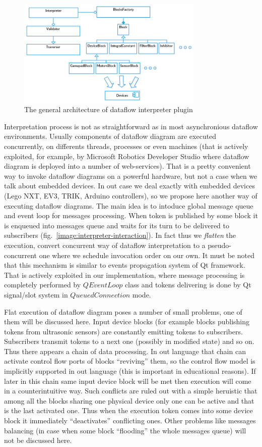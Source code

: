 \documentclass[conference,compsoc]{IEEEtran}
\begin{document}
\begin{figure}[ht]
	\centering
	\includegraphics[width=3.5in]{Interpreter.png}
	\caption{The general architecture of dataflow interpreter plugin}
	\label{image:interpreter-architecture}
\end{figure}

Interpretation process is not as straightforward as in most asynchronious dataflow environments. Usually components of dataflow diagram are executed concurrently, on differents threads, processes or even machines (that is actively exploited, for example, by Microsoft Robotics Developer Studio where dataflow diagram is deployed into a number of web-services). That is a pretty convenient way to invoke dataflow diagrams on a powerful hardware, but not a case when we talk about embedded devices. In out case we deal exactly with embedded devices (Lego NXT, EV3, TRIK, Arduino controllers), so we propose here another way of executing dataflow diagrams. The main idea is to intoduce global message queue and event loop for messages processing. When token is published by some block it is enqueued into messages queue and waits for its turn to be delivered to subscribers (fig.~\ref{image:interpreter-interaction}). In fact thus we \textit{flatten} the execution, convert concurrent way of dataflow interpretation to a pseudo-concurrent one where we schedule invocation order on our own. It must be noted that this mechanism is similar to events propagation system of Qt framework. That is actively exploited in our implementation, where message processing is completely performed by $QEventLoop$ class and tokens delivering is done by Qt signal/slot system in $QueuedConnection$ mode. 

Flat execution of dataflow diagram poses a number of small problems, one of them will be discussed here. Input device blocks (for example blocks publishing tokens from ultrasonic sensors) are constantly emitting tokens to subscribers. Subscribers transmit tokens to a next one (possibly in modified state) and so on. Thus there appears a chain of data processing. In out language that chain can activate control flow ports of blocks ``reviving'' them, so the control flow model is implicitly supported in out language (this is important in educational reasons). If later in this chain same input device block will be met then execution will come in a 
counterintuitive way. Such conflicts are ruled out with a simple heruistic that among all the blocks sharing one physical device only one can be active and that is the last activated one. Thus when the execution token comes into some device block it immediately ``deactivates'' conflicting ones. Other problems like messages balancing (in case when some block ``flooding'' the whole messages queue) will not be discussed here.
\end{document}
